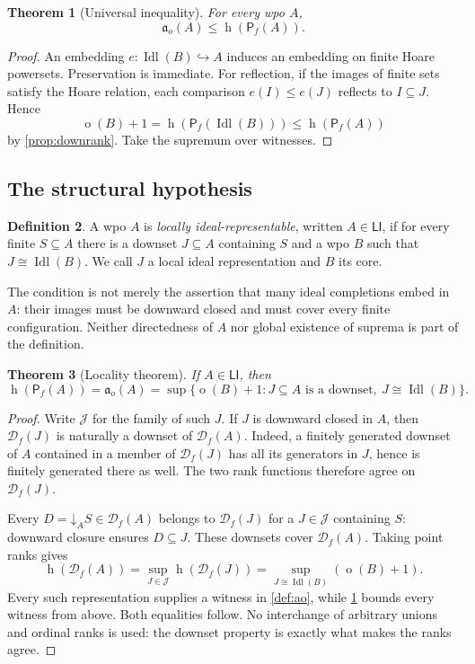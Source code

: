 \documentclass[11pt,letterpaper]{article}
\theoremstyle{teal}
\newtheorem{theorem}{Theorem}[section]
\theoremstyle{definition}
\newtheorem{definition}[theorem]{Definition}
\newcommand{\Pf}{\mathsf P_{\!f}}
\newcommand{\Df}{\mathcal D_{\!f}}
\newcommand{\Idl}{\operatorname{Idl}}
\newcommand{\hgt}{\operatorname{h}}
\newcommand{\mot}{\operatorname{o}}
\newcommand{\ao}{\mathfrak a_o}
\newcommand{\emb}{\hookrightarrow}
\newcommand{\LI}{\mathsf{LI}}
\newcommand{\dn}{\mathord\downarrow}
\begin{document}
\begin{theorem}[Universal inequality]\label{thm:lower}
For every wpo $A$,
\[
 \ao(A)\leq\hgt(\Pf(A)).
\]
\end{theorem}
\begin{proof}
An embedding $e:\Idl(B)\emb A$ induces an embedding on finite Hoare powersets. Preservation is immediate. For reflection, if the images of finite sets satisfy the Hoare relation, each comparison $e(I)\leq e(J)$ reflects to $I\subseteq J$. Hence
\[
 \mot(B)+1=\hgt(\Pf(\Idl(B)))\leq\hgt(\Pf(A))
\]
by \cref{prop:downrank}. Take the supremum over witnesses.
\end{proof}

\subsection{The structural hypothesis}
\begin{definition}\label{def:LI}
A wpo $A$ is \emph{locally ideal-representable}, written $A\in\LI$, if for every finite $S\subseteq A$ there is a downset $J\subseteq A$ containing $S$ and a wpo $B$ such that $J\cong\Idl(B)$. We call $J$ a local ideal representation and $B$ its core.
\end{definition}

The condition is not merely the assertion that many ideal completions embed in $A$: their images must be downward closed and must cover every finite configuration. Neither directedness of $A$ nor global existence of suprema is part of the definition.

\begin{theorem}[Locality theorem]\label{thm:locality}
If $A\in\LI$, then
\begin{equation}\label{eq:main}
 \hgt(\Pf(A))=\ao(A)
 =\sup\{\mot(B)+1:J\subseteq A\text{ is a downset},\ J\cong\Idl(B)\}.
\end{equation}
\end{theorem}
\begin{proof}
Write $\mathcal J$ for the family of such $J$. If $J$ is downward closed in $A$, then $\Df(J)$ is naturally a downset of $\Df(A)$. Indeed, a finitely generated downset of $A$ contained in a member of $\Df(J)$ has all its generators in $J$, hence is finitely generated there as well. The two rank functions therefore agree on $\Df(J)$.

Every $D=\dn_A S\in\Df(A)$ belongs to $\Df(J)$ for a $J\in\mathcal J$ containing $S$: downward closure ensures $D\subseteq J$. These downsets cover $\Df(A)$. Taking point ranks gives
\[
 \hgt(\Df(A))=\sup_{J\in\mathcal J}\hgt(\Df(J))
 =\sup_{J\cong\Idl(B)}(\mot(B)+1).
\]
Every such representation supplies a witness in \cref{def:ao}, while \cref{thm:lower} bounds every witness from above. Both equalities follow. No interchange of arbitrary unions and ordinal ranks is used: the downset property is exactly what makes the ranks agree.
\end{proof}
\end{document}
